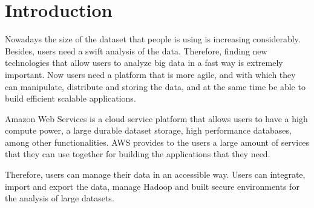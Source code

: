 
\label{sec:introduction}
\section{Introduction}

Nowadays the size of the dataset that people is using is increasing considerably. Besides, users need a swift analysis of the data. Therefore, finding new technologies that allow users to analyze big data in a fast way is extremely important. Now users need a platform that is more agile, and with which they can manipulate, distribute and storing the data, and at the same time be able to build efficient scalable applications.

Amazon Web Services is a cloud service platform that allows users to have a high compute power, a large durable dataset storage, high performance databases, among other functionalities. AWS provides to the users a large amount of services that they can use together for building the applications that they need.

Therefore, users can manage their data in an accessible way. Users can integrate, import and export the data, manage Hadoop and built secure environments for the analysis of large datasets.


